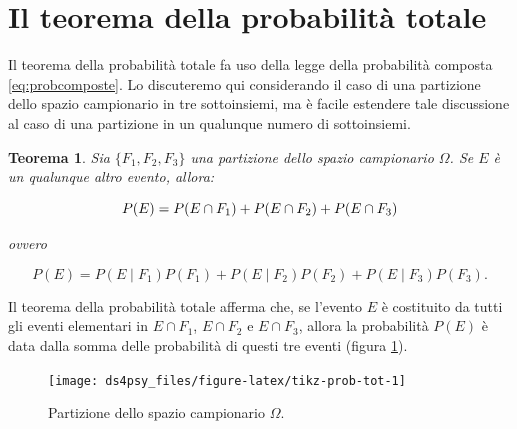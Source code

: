 \documentclass[
  11pt,
]{krantz}
\newtheorem{theorem}{Teorema}[chapter]
\theoremstyle{definition}
\theoremstyle{definition}
\theoremstyle{definition}
\theoremstyle{definition}
\theoremstyle{remark}
\begin{document}
\hypertarget{il-teorema-della-probabilituxe0-totale}{%
\section{Il teorema della probabilità totale}\label{il-teorema-della-probabilituxe0-totale}}

Il teorema della probabilità totale fa uso della legge della probabilità composta \eqref{eq:probcomposte}. Lo discuteremo qui considerando il caso di una partizione dello spazio campionario in tre sottoinsiemi, ma è facile estendere tale discussione al caso di una partizione in un qualunque numero di sottoinsiemi.

\begin{theorem}
Sia \(\{F_1, F_2, F_3\}\) una partizione dello spazio campionario \(\Omega\). Se \(E\) è un qualunque altro evento, allora:

\begin{equation}
P(E) = P(E \cap F_1) + P(E \cap F_2) + P(E \cap F_3) \notag
\label{eq:prob-total-1a}
\end{equation}

ovvero

\begin{equation}
P(E) = P(E \mid F_1) P(F_1) + P (E \mid F_2) P(F_2) + P(E \mid F_3) P(F_3).
\label{eq:prob-total-1b}
\end{equation}
\end{theorem}

Il teorema della probabilità totale afferma che, se l'evento \(E\) è costituito da tutti gli eventi elementari in \(E \cap F_1\), \(E \cap F_2\) e \(E \cap F_3\), allora la probabilità \(P(E)\) è data dalla somma delle probabilità di questi tre eventi (figura \ref{fig:tikz-prob-tot}).

\begin{figure}[h]

{\centering \texttt{[image: ds4psy\_files/figure-latex/tikz-prob-tot-1]} 

}

\caption{Partizione dello spazio campionario $\Omega$.}\label{fig:tikz-prob-tot}
\end{figure}
\end{document}
